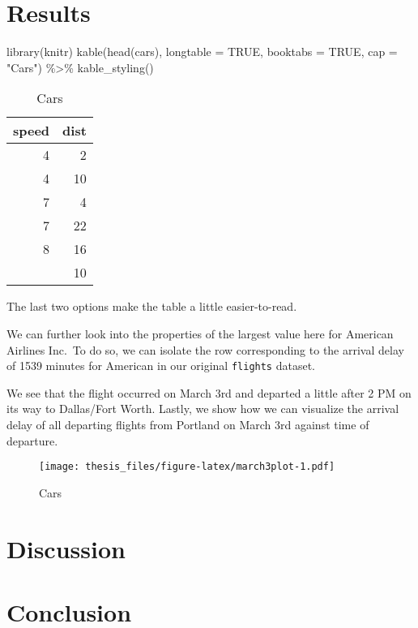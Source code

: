 \documentclass[twoside,12pt,final]{ucthesis-CA2012}
\newenvironment{Shaded}{}{}
\newcommand{\ConstantTok}[1]{\textcolor[rgb]{0.53,0.00,0.00}{{#1}}}
\newcommand{\SpecialCharTok}[1]{\textcolor[rgb]{0.25,0.44,0.63}{{#1}}}
\newcommand{\AttributeTok}[1]{\textcolor[rgb]{0.49,0.56,0.16}{{#1}}}
\newcommand{\StringTok}[1]{\textcolor[rgb]{0.25,0.44,0.63}{{#1}}}
\newcommand{\FunctionTok}[1]{\textcolor[rgb]{0.02,0.16,0.49}{{#1}}}
\newcommand{\NormalTok}[1]{{#1}}
\begin{document}
\begin{ucmainmatter}
{\section{Results}\label{results}}
\begin{Shaded}
\begin{Highlighting}[]
\FunctionTok{library}\NormalTok{(knitr)}
\FunctionTok{kable}\NormalTok{(}\FunctionTok{head}\NormalTok{(cars),}
      \AttributeTok{longtable =} \ConstantTok{TRUE}\NormalTok{,}
      \AttributeTok{booktabs =} \ConstantTok{TRUE}\NormalTok{, }\AttributeTok{cap =} \StringTok{"Cars"}\NormalTok{) }\SpecialCharTok{\%\textgreater{}\%} \FunctionTok{kable\_styling}\NormalTok{()}
\end{Highlighting}
\end{Shaded}
\begin{longtable}[t]{rr}
\caption{\label{tab:maxdelays}Cars}\\
\toprule
speed & dist\\
\midrule
4 & 2\\
4 & 10\\
7 & 4\\
7 & 22\\
8 & 16\\
\addlinespace
9 & 10\\
\bottomrule
\end{longtable}
The last two options make the table a little easier-to-read.

We can further look into the properties of the largest value here for American Airlines Inc.~To do so, we can isolate the row corresponding to the arrival delay of 1539 minutes for American in our original \texttt{flights} dataset.

We see that the flight occurred on March 3rd and departed a little after 2 PM on its way to Dallas/Fort Worth. Lastly, we show how we can visualize the arrival delay of all departing flights from Portland on March 3rd against time of departure.
\begin{figure}
\centering
\texttt{[image: thesis\_files/figure-latex/march3plot-1.pdf]}
\caption{\label{fig:march3plot}Cars}
\end{figure}
\hypertarget{discussion}{%
\section{Discussion}\label{discussion}}

\hypertarget{conclusion}{%
\section{Conclusion}\label{conclusion}}


\end{ucmainmatter}
\end{document}
